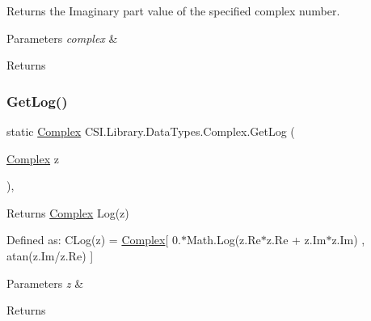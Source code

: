 Returns the Imaginary part value of the specified complex number. 


\begin{DoxyParams}{Parameters}
{\em complex} & \\
\hline
\end{DoxyParams}
\begin{DoxyReturn}{Returns}

\end{DoxyReturn}
\mbox{\label{struct_c_s_i_1_1_library_1_1_data_types_1_1_complex_a935a7f7138240e3e3e270975700449d4}} 
\subsubsection{\texorpdfstring{GetLog()}{GetLog()}}
{\footnotesize\ttfamily static \mbox{\hyperlink{struct_c_s_i_1_1_library_1_1_data_types_1_1_complex}{Complex}} C\+S\+I.\+Library.\+Data\+Types.\+Complex.\+Get\+Log (\begin{DoxyParamCaption}\item[{\mbox{\hyperlink{struct_c_s_i_1_1_library_1_1_data_types_1_1_complex}{Complex}}}]{z }\end{DoxyParamCaption})\hspace{0.3cm}{\ttfamily [inline]}, {\ttfamily [static]}}



Returns \mbox{\hyperlink{struct_c_s_i_1_1_library_1_1_data_types_1_1_complex}{Complex}} Log(z) 

Defined as\+: C\+Log(z) = \mbox{\hyperlink{struct_c_s_i_1_1_library_1_1_data_types_1_1_complex}{Complex}}\mbox{[} 0.$\ast$\+Math.Log(z.\+Re$\ast$z.Re + z.\+Im$\ast$z.Im) , atan(z.\+Im/z.Re) \mbox{]}


\begin{DoxyParams}{Parameters}
{\em z} & \\
\hline
\end{DoxyParams}
\begin{DoxyReturn}{Returns}

\end{DoxyReturn}
\mbox{\label{struct_c_s_i_1_1_library_1_1_data_types_1_1_complex_a3ca835a74fdfc301ade249375e099138}} 
